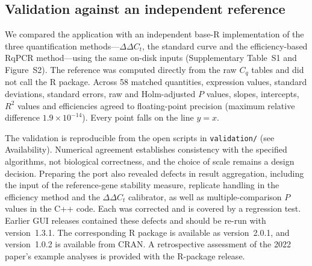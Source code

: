 \subsection{Validation against an independent reference}

{\sloppy We compared the application with an independent base-R implementation
of the three quantification methods---$\Delta\Delta C_t$, the standard curve
and the efficiency-based RqPCR method---using the same on-disk inputs
(Supplementary Table~S1 and Figure~S2). The reference was computed directly
from the raw $C_q$ tables and did not call the R package.
Across 58 matched quantities, expression values, standard deviations,
standard errors, raw and Holm-adjusted $P$ values, slopes, intercepts,
$R^2$ values and efficiencies agreed to floating-point precision (maximum
relative difference $1.9 \times 10^{-14}$). Every point falls on the line
$y = x$.\par}

The validation is reproducible from the open scripts in \texttt{validation/}
(see Availability). Numerical agreement establishes consistency with the
specified algorithms, not biological correctness, and the choice of scale
remains a design decision. Preparing the port also revealed defects in result
aggregation, including the input of the reference-gene stability measure,
replicate handling in the efficiency method and the $\Delta\Delta C_t$
calibrator, as well as multiple-comparison $P$ values in the C++ code. Each
was corrected and is covered by a regression test. Earlier GUI releases
contained these defects and should be re-run with version~1.3.1. The
corresponding R package is available as version~2.0.1, and version~1.0.2 is
available from CRAN. A retrospective assessment of the 2022 paper's example
analyses is provided with the R-package release.
